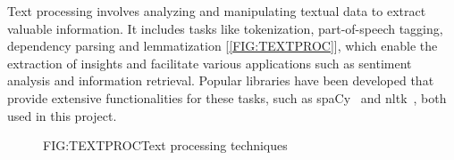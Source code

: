 Text processing involves analyzing and manipulating textual data to extract valuable information. It includes tasks like tokenization, part-of-speech tagging, dependency parsing and lemmatization [\ref{FIG:TEXTPROC}], which enable the extraction of insights and facilitate various applications such as sentiment analysis and information retrieval. Popular libraries have been developed that provide extensive functionalities for these tasks, such as spaCy~\cite{SPACY} and \ac{nltk}~\cite{NLTK}, both used in this project.

\begin{figure}[Text processing techniques]{FIG:TEXTPROC}{Text processing techniques}
    \vspace{0.4em}
    \begin{subfigure}[SBFIG:Tokenization]{Tokenization}{}
    \end{subfigure}
    \hspace{2em}
    \begin{subfigure}[SBFIG:POSTagging]{\href{https://www.ling.upenn.edu/courses/Fall_2003/ling001/penn_treebank_pos.html}{Part-of-speech tagging}}{}
    \end{subfigure}

    \vspace{1em}
    \begin{subfigure}[SBFIG:DependencyParse]{\href{https://universaldependencies.org/en/dep/}{Dependency parsing}}{}
    \end{subfigure}
    \hspace{2em}
    \begin{subfigure}[SBFIG:Lemmatization]{Lemmatization}{}
    \end{subfigure}
\end{figure}

